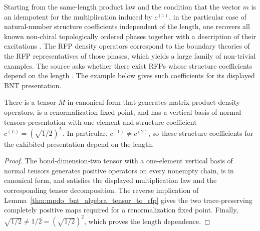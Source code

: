 \begin{remark}%
    \label{rem:mpdo_bnt_label_length_independent_topological}
    Starting from the same-length product law and the condition that the
    vector $m$ is an idempotent for the multiplication induced by $c^{(1)}$,
    in the particular case of natural-number structure coefficients
    independent of the length, one recovers all known non-chiral
    topologically ordered phases together with a description of their
    excitations \cite{Bultinck2017Anyons}. The RFP density operators
    correspond to the boundary theories of the RFP representatives of those
    phases, which yields a large family of non-trivial examples. The source
    asks whether there exist RFPs whose structure coefficients depend on the
    length \cite[Section~4.5]{Cirac2016MPDO_arXiv}. The example below gives
    such coefficients for its displayed BNT presentation.
\end{remark}

\begin{lemma}%
    \label{thm:mpdo_length_dependent_rfp_example}
    \leanok
    There is a tensor $M$ in canonical form that generates matrix product
    density operators, is a renormalization fixed point, and
    has a vertical basis-of-normal-tensors presentation with one element and structure
    coefficient $c^{(L)}=(\sqrt{1/2})^L$.
    In particular, $c^{(1)}\ne c^{(2)}$, so these structure coefficients
    for the exhibited presentation depend on the length.
\end{lemma}
\begin{proof}\leanok
    The bond-dimension-two tensor with a one-element vertical basis of normal tensors
    generates positive operators on every nonempty chain, is in canonical form, and
    satisfies the displayed multiplication law and the corresponding
    tensor decomposition. The reverse implication of
    Lemma~\ref{thm:mpdo_bnt_algebra_tensor_to_rfp} gives the two
    trace-preserving completely positive maps required for a renormalization fixed point. Finally,
    $\sqrt{1/2}\ne1/2=(\sqrt{1/2})^2$, which proves the length dependence.
\end{proof}

